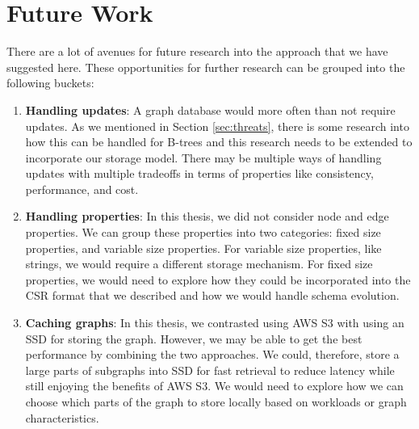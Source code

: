 \section{Future Work}\label{sec:futureWork}
There are a lot of avenues for future research into the approach that we have
suggested here. These opportunities for further research can be grouped into the
following buckets:
\begin{enumerate}
    \item \textbf{Handling updates}: A graph database would more often than not
        require updates. As we mentioned in Section \ref{sec:threats}, there is
        some research into how this can be handled for B-trees and this research
        needs to be extended to incorporate our storage model. There may be
        multiple ways of handling updates with multiple tradeoffs in terms of
        properties like consistency, performance, and cost.
    \item \textbf{Handling properties}: In this thesis, we did not consider node
        and edge properties. We can group these properties into two categories:
        fixed size properties, and variable size properties. For variable size
        properties, like strings, we would require a different storage
        mechanism. For fixed size properties, we would need to explore how they
        could be incorporated into the CSR format that we described and how
        we would handle schema evolution.
    \item \textbf{Caching graphs}: In this thesis, we contrasted using AWS S3
        with using an SSD for storing the graph. However, we may be able to get
        the best performance by combining the two approaches. We could,
        therefore, store a large parts of subgraphs into SSD for fast retrieval
        to reduce latency while still enjoying the benefits of AWS S3. We would
        need to explore how we can choose which parts of the graph to store locally
        based on workloads or graph characteristics.
\end{enumerate}
